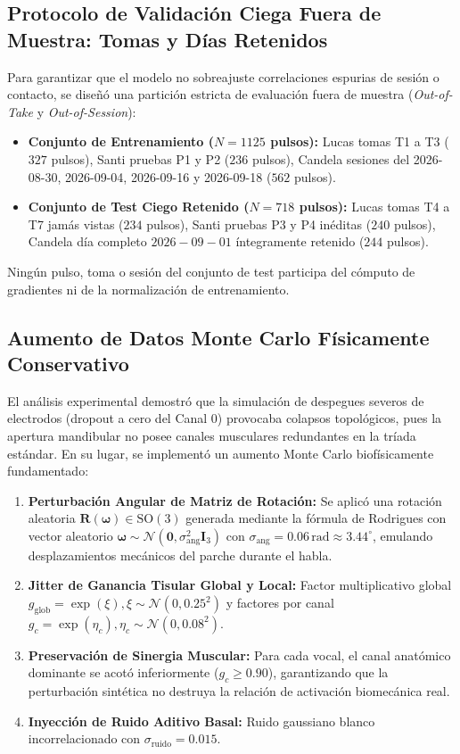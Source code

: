 \documentclass[11pt,a4paper,openany]{book}
\theoremstyle{definition}
\begin{document}
\subsection{Protocolo de Validación Ciega Fuera de Muestra: Tomas y Días Retenidos}
\label{subsec:protocolo_holdout_ciego}

Para garantizar que el modelo no sobreajuste correlaciones espurias de sesión o contacto, se diseñó una partición estricta de evaluación fuera de muestra (\textit{Out-of-Take} y \textit{Out-of-Session}):
\begin{itemize}
    \item \textbf{Conjunto de Entrenamiento ($N = 1125$ pulsos):} Lucas tomas T1 a T3 ($327$ pulsos), Santi pruebas P1 y P2 ($236$ pulsos), Candela sesiones del 2026-08-30, 2026-09-04, 2026-09-16 y 2026-09-18 ($562$ pulsos).
    \item \textbf{Conjunto de Test Ciego Retenido ($N = 718$ pulsos):} Lucas tomas T4 a T7 jamás vistas ($234$ pulsos), Santi pruebas P3 y P4 inéditas ($240$ pulsos), Candela día completo $2026-09-01$ íntegramente retenido ($244$ pulsos).
\end{itemize}
Ningún pulso, toma o sesión del conjunto de test participa del cómputo de gradientes ni de la normalización de entrenamiento.

\subsection{Aumento de Datos Monte Carlo Físicamente Conservativo}
\label{subsec:montecarlo_fisico}

El análisis experimental demostró que la simulación de despegues severos de electrodos (dropout a cero del Canal 0) provocaba colapsos topológicos, pues la apertura mandibular no posee canales musculares redundantes en la tríada estándar. En su lugar, se implementó un aumento Monte Carlo biofísicamente fundamentado:
\begin{enumerate}
    \item \textbf{Perturbación Angular de Matriz de Rotación:} Se aplicó una rotación aleatoria $\mathbf{R}(\boldsymbol{\omega}) \in \text{SO}(3)$ generada mediante la fórmula de Rodrigues con vector aleatorio $\boldsymbol{\omega} \sim \mathcal{N}(\mathbf{0}, \sigma_{\text{ang}}^2 \mathbf{I}_3)$ con $\sigma_{\text{ang}} = 0.06\,\text{rad} \approx 3.44^\circ$, emulando desplazamientos mecánicos del parche durante el habla.
    \item \textbf{Jitter de Ganancia Tisular Global y Local:} Factor multiplicativo global $g_{\text{glob}} = \exp(\xi), \xi \sim \mathcal{N}(0, 0.25^2)$ y factores por canal $g_c = \exp(\eta_c), \eta_c \sim \mathcal{N}(0, 0.08^2)$.
    \item \textbf{Preservación de Sinergia Muscular:} Para cada vocal, el canal anatómico dominante se acotó inferiormente ($g_c \ge 0.90$), garantizando que la perturbación sintética no destruya la relación de activación biomecánica real.
    \item \textbf{Inyección de Ruido Aditivo Basal:} Ruido gaussiano blanco incorrelacionado con $\sigma_{\text{ruido}} = 0.015$.
\end{enumerate}
\end{document}
